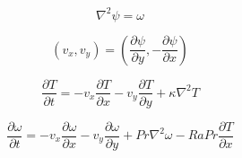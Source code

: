 \documentclass{article}
\begin{document}
\begin{equation}
    \nabla^2 \psi = \omega
\end{equation}

\begin{equation}
    \left( v_x, v_y \right) = \left( \frac{\partial \psi}{\partial y}, -\frac{\partial \psi}{\partial x} \right)
\end{equation}

\begin{equation}
    \frac{\partial T}{\partial t} = -v_x \frac{\partial T}{\partial x} -v_y \frac{\partial T}{\partial y} + \kappa \nabla^2 T
\end{equation}

\begin{equation}
    \frac{\partial \omega}{\partial t} = -v_x \frac{\partial \omega}{\partial x} -v_y \frac{\partial \omega}{\partial y} + Pr \nabla^2 \omega - Ra Pr \frac{\partial T}{\partial x}
\end{equation}
\end{document}
